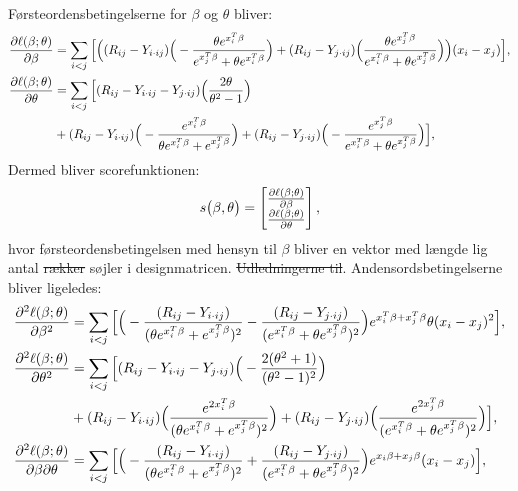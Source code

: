 \documentclass[11pt,a4paper]{article}
\begin{document}
Førsteordensbetingelserne for $\beta$ og $\theta$ bliver:
\begin{align*}
\frac{\partial \ell(\beta;\theta)}{\partial \beta}&= 
\sum_{i<j}\Big{[}\Big{(}
(R_{ij}-Y_{i\cdot ij})\Big{(}-\frac{\theta e^{x_i^T\beta}}{e^{x_j^T\beta}+\theta e^{x_i^T\beta}}\Big{)}+(R_{ij}-Y_{j\cdot ij})\Big{(}\frac{\theta e^{x_j^T\beta}}{e^{x_i^T\beta}+\theta e^{x_j^T\beta}}\Big{)}\Big{)}(x_i-x_j)\Big{]},\\
\frac{\partial \ell(\beta;\theta)}{\partial \theta}&=
\sum_{i<j}
\Big{[}
 (R_{ij}-Y_{i\cdot ij}-Y_{j\cdot ij})\Big{(}\frac{2\theta}{\theta^2-1}\Big{)}\\
 &+(R_{ij}-Y_{i\cdot ij})\Big{(}-\frac{e^{x_i^T\beta}}{\theta e^{x_i^T\beta}+e^{x_j^T\beta}}\Big{)}
 +(R_{ij}-Y_{j\cdot ij})\Big{(}-\frac{e^{x_j^T\beta}}{e^{x_i^T\beta}+\theta e^{x_j^T\beta}}\Big{)}
\Big{]},\\
\end{align*}
Dermed bliver scorefunktionen:
\begin{equation}
s\big{(}\beta,\theta\big{)} = \begin{bmatrix}
\frac{\partial \ell(\beta;\theta)}{\partial \beta}\\
\frac{\partial \ell(\beta;\theta)}{\partial \theta}
\end{bmatrix},
\label{score}
\end{equation}
hvor førsteordensbetingelsen med hensyn til $\beta$ bliver en vektor med længde lig antal \sout{rækker} søjler i designmatricen. 
\sout{Udledningerne til}. Andensordsbetingelserne bliver ligeledes: 
\begin{align*}
\frac{\partial^2 \ell(\beta;\theta)}{\partial \beta^2}
&= \sum_{i<j}\Big{[}\Big{(} -\frac{(R_{ij}-Y_{i\cdot ij})}{(\theta e^{x_i^T\beta}+e^{x_j^T\beta})^2}-\frac{(R_{ij}-Y_{j\cdot ij})}{(e^{x_i^T\beta}+\theta e^{x_j^T\beta})^2}\Big{)}e^{x_i^T\beta+x_j^T\beta}\theta(x_{i}-x_{j})^2 \Big{]},\\
\frac{\partial^2 \ell(\beta;\theta)}{\partial \theta^2}
&= \sum_{i<j} 
\Big{[}
(R_{ij}-Y_{i\cdot ij}-Y_{j\cdot ij})\Big{(}-\frac{2(\theta^2+1)}{(\theta^2-1)^2}\Big{)}\\
&+(R_{ij}-Y_{i\cdot ij})\Big{(}\frac{e^{2x_i^T\beta}}{(\theta e^{x_i^T\beta}+e^{x_j^T\beta})^2}\Big{)}
+(R_{ij}-Y_{j\cdot ij})\Big{(}\frac{e^{2x_j^T\beta}}{(e^{x_i^T\beta}+\theta e^{x_j^T\beta})^2}\Big{)}\Big{]},
\\
\frac{\partial^2 \ell(\beta;\theta)}{\partial \beta\partial \theta}
&= \sum_{i<j}\Big{[}\Big{(}
-\frac{(R_{ij}-Y_{i \cdot ij})}{(\theta e^{x_i^T\beta}+e^{x_j^T\beta})^2}
+\frac{(R_{ij}-Y_{j \cdot ij})}{(e^{x_i^T\beta}+\theta e^{x_j^T\beta})^2}\Big{)}e^{x_i\beta+x_j\beta}(x_{i}-x_{j})\Big{]},
\end{align*}
\end{document}
